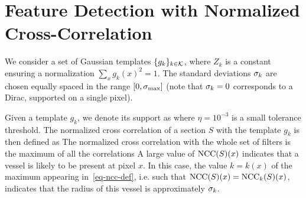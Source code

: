 
\section{Feature Detection with Normalized Cross-Cor\-re\-la\-tion}
\label{app-crosscorrel}

We consider a set of Gaussian templates $\{g_k\}_{k \in \mathcal{K}}$, 
where $Z_k$ is a constant ensuring a normalization $\sum_x g_k(x)^2 = 1$.
The standard deviations $\sigma_k$ are chosen equally spaced in the range $[0,\sigma_{\max}]$ (note that $\sigma_k=0$ corresponds to a Dirac, supported on a single pixel). 

Given a template $g_k$, we denote its support as 
where $\eta = 10^{-3}$ is a small tolerance threshold. The normalized cross correlation of a section $S$ with the template $g_k$ is then defined as
The normalized cross correlation with the whole set of filters is the maximum of all the correlations
A large value of $\operatorname{NCC}(S)(x)$ indicates that a vessel is likely to be present at pixel $x$. In this case, the value $k=k(x)$ of the maximum appearing in~\eqref{eq-ncc-def}, i.e. such that $\operatorname{NCC}(S)(x) =  \operatorname{NCC}_k(S)(x)$, indicates that the radius of this vessel is approximately $\sigma_k$.  

